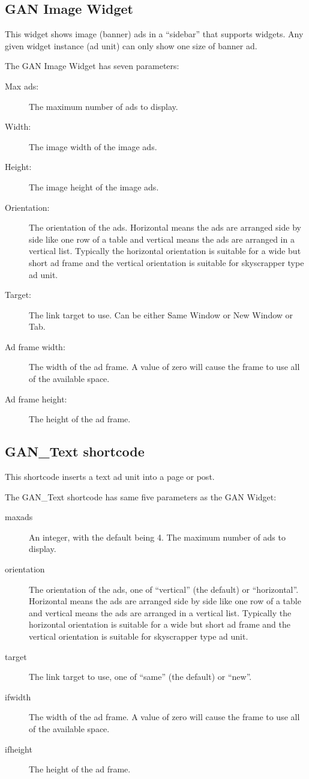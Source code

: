 \documentclass[letterpaper]{article}
\begin{document}
\subsection{GAN Image Widget}

This widget shows image (banner)  ads in a ``sidebar'' that supports
widgets.  Any given widget instance (ad unit) can only show one size of
banner ad.

The GAN Image Widget has seven parameters:
\begin{description}
  \item[Max ads:] The maximum number of ads to display.
  \item[Width:] The image width of the image ads.
  \item[Height:] The image height of the image ads.
  \item[Orientation:] The orientation of the ads. Horizontal
means the ads are arranged side by side like one row of a table and
vertical means the ads are arranged in a vertical list. Typically the
horizontal orientation is suitable for a wide but short ad frame and the
vertical orientation is suitable for skyscrapper type ad unit.
  \item[Target:] The link target to use. Can be either Same 
Window or New Window or Tab.
  \item[Ad frame width:] The width of the ad frame. A value
of zero will cause the frame to use all of the available space.
  \item[Ad frame height:] The height of the ad frame.
\end{description}

\subsection{GAN\_Text shortcode}

This shortcode inserts a text ad unit into a page or post.

The GAN\_Text shortcode has same five parameters as the GAN
Widget:
\begin{description}
  \item[maxads] An integer, with the default being 4.
The maximum number of ads to display.
  \item[orientation] The orientation of the ads, one of
``vertical'' (the default) or ``horizontal''. Horizontal means the ads are
arranged side by side like one row of a table and      vertical means
the ads are arranged in a vertical list. Typically the horizontal
orientation is suitable for a wide but short ad frame and the vertical
orientation is suitable for skyscrapper type ad unit.
  \item[target] The link target to use, one of ``same'' (the
default) or ``new''.
  \item[ifwidth] The width of the ad frame. A value
of zero will cause the frame to use all of the available space.
  \item[ifheight] The height of the ad frame.
\end{description}
\end{document}
